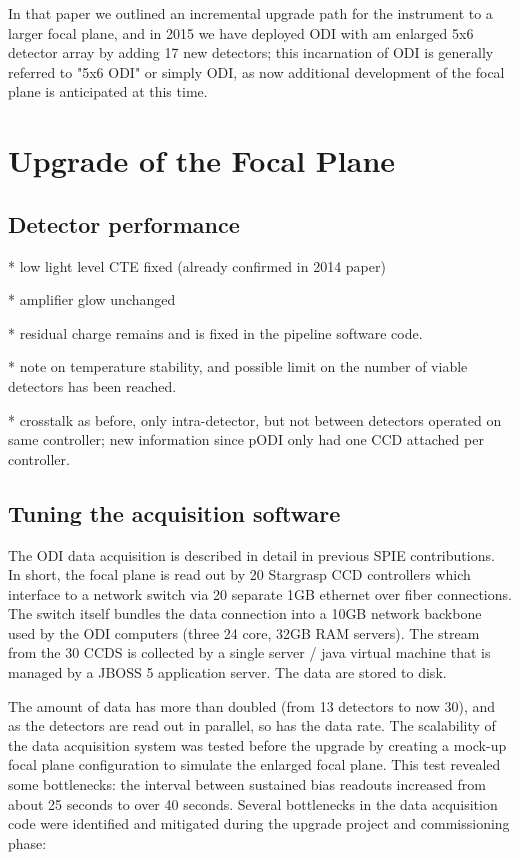 \documentclass[draft]{spieman}
\begin{document}
In that paper we outlined an incremental upgrade path for the instrument to a
larger focal plane, and in 2015 we have deployed ODI with am enlarged 5x6
detector array by adding 17 new detectors; this incarnation of ODI is generally
referred to "5x6 ODI" or simply ODI, as now additional development of the focal
plane is anticipated at this time.


\section{Upgrade of the Focal Plane}

\subsection{Detector performance}

* low light level CTE fixed (already confirmed in 2014 paper)

* amplifier glow unchanged

* residual charge remains and is fixed in the pipeline software code.  

\cite{Lesser2012}

* note on temperature stability, and possible limit on the number of viable detectors has been 
reached.

* crosstalk as before, only intra-detector, but not between detectors operated on same controller; 
new information since pODI only had one CCD attached per controller. 



\subsection{Tuning the acquisition software}

The ODI data acquisition is described in detail in previous SPIE contributions\cite{Yeatts2008,Yeatts2010}.
In short, the focal plane is read out by 20 Stargrasp CCD controllers which
interface to a network switch via 20 separate 1GB ethernet over fiber
connections. The switch itself bundles the data connection into a 10GB network
backbone used by the ODI computers (three 24 core, 32GB RAM servers). The stream
from the 30 CCDS is collected by a single server / java virtual machine that is
managed by a JBOSS 5 application server. The data are stored to disk.

The amount of data has more than doubled (from 13 detectors to now 30), and as
the detectors are read out in parallel, so has the data rate. The scalability of
the data acquisition system was tested before the upgrade by creating a mock-up
focal plane  configuration to simulate the enlarged focal plane. This test
revealed some bottlenecks: the interval between sustained bias readouts
increased from about 25 seconds to over 40 seconds. Several bottlenecks in the
data acquisition code were identified and mitigated during the upgrade project
and commissioning phase:
\end{document}
